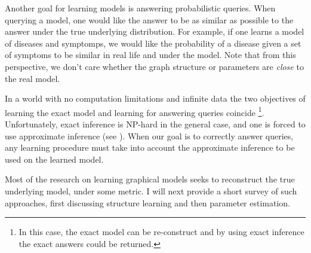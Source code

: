 
Another goal for learning models %
is answering probabilistic queries.
When querying a model, one would like the answer to be as similar as possible to the answer under the true underlying distribution.
For example, if one learns a model of diseases and symptomps, we would like the probability of a disease given a set of symptoms to be similar in real life and under the model.
Note that from this perspective, we don't care whether the graph structure or parameters are {\em close} to the real model. 


In a world with no computation limitations and infinite data the two objectives of learning the exact model and learning for answering queries coincide
\footnote{In this case, the exact model can be re-construct and by using exact inference the exact answers could be returned.}.
Unfortunately, exact inference is NP-hard in the general case, and one is forced to use approximate inference (see ).
When our goal is to correctly answer queries, any learning procedure must take into account the approximate inference to be used on the learned model.



Most of the research on learning graphical models seeks to reconstruct the true underlying model, under some metric. I will next provide a short survey of such approaches, first discussing structure learning and then parameter estimation.



